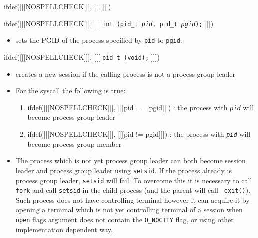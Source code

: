 
ifdef([[[NOSPELLCHECK]]], [[[
]]])

\begin{slide}
ifdef([[[NOSPELLCHECK]]], [[[
\texttt{int (pid\_t \emph{pid}, pid\_t \emph{pgid});}
]]])
\begin{itemize}
\item sets the PGID of the process specified by \texttt{pid} to \texttt{pgid}.
\end{itemize}
ifdef([[[NOSPELLCHECK]]], [[[
\texttt{pid\_t (void);}
]]])
\begin{itemize}
\item creates a new session if the calling process is not a process
group leader
\end{itemize}
\end{slide}

\begin{itemize}
\item For the  syscall the following is true:
\begin{enumerate}
\item ifdef([[[NOSPELLCHECK]]], [[[pid == pgid]]]) : the process with
\emph{\texttt{pid}} will become process group leader
\item ifdef([[[NOSPELLCHECK]]], [[[pid != pgid]]]) : the process with
\emph{\texttt{pid}} will become process group member
\end{enumerate}
\item The process which is not yet process group leader can both become session
leader and process group leader using \texttt{setsid}. If the process already is
process group leader, \texttt{setsid} will fail. To overcome this it is necessary
to call \texttt{fork} and call \texttt{setsid} in the child process
(and the parent will call \texttt{\_exit()}).
Such process does not have controlling terminal however it can acquire it by
opening a terminal which is not yet controlling terminal of a session when
\texttt{open} flags argument does not contain the \texttt{O\_NOCTTY} flag,
or using other implementation dependent way.
\end{itemize}




